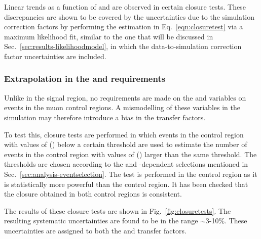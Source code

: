 Linear trends as a function of \scalht and \njet are observed in certain 
closure tests. These discrepancies are shown to be covered by the uncertainties 
due to the simulation correction factors by performing the estimation in 
Eq.~\ref{eqn:closuretest} via a maximum likelihood fit, similar to the one that 
will be discussed in Sec.~\ref{sec:results-likelihoodmodel}, in which the 
data-to-simulation correction factor uncertainties are included.

\subsubsection{Extrapolation in the \alphat and \bdphi requirements}
Unlike in the signal region, no requirements are made on the \alphat and \bdphi 
variables on events in the muon control regions. A mismodelling of these 
variables in the simulation may therefore introduce a bias in the transfer 
factors.

To test this, closure tests are performed in which events in the \mj control 
region with values of \alphat (\bdphi) below a certain threshold are used to 
estimate the number of events in the \mj control region with values of \alphat 
(\bdphi) larger than the same threshold. The thresholds are chosen according to 
the \bdphi and \scalht-dependent \alphat selections mentioned in 
Sec.~\ref{sec:analysis-eventselection}. The test is performed in the \mj 
control region as it is statistically more powerful than the \mmj control 
region. It has been checked that the closure obtained in both control regions 
is consistent.

The results of these closure tests are shown in Fig.~\ref{fig:closuretests}. 
The resulting systematic uncertainties are found to be in the range 
$\sim$3-10\%. These uncertainties are assigned to both the \Tmutottw and 
\Tmumutoz transfer factors. 

